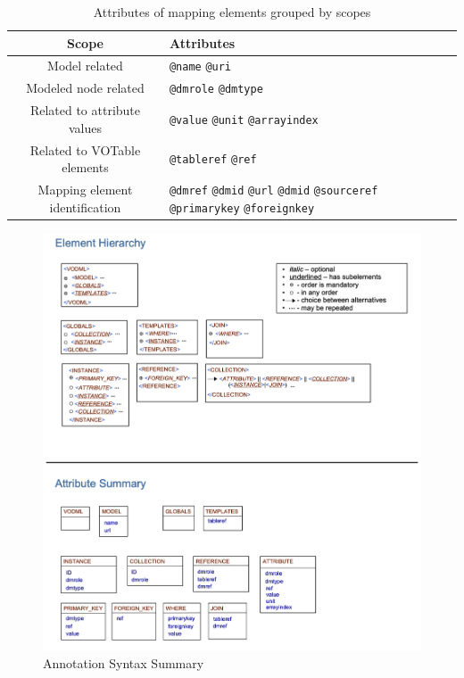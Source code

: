 \begin{table}[!htbp]
\small
\centering
\begin{tabulary}{\linewidth}{|c|J|}       
       \hline 
            \textbf{Scope} & 
            \textbf {Attributes}\\
       \hline         
       \hline  
             Model related & 
             \texttt{@name} \texttt{@uri} \\
       \hline  
             Modeled node related & 
             \texttt{@dmrole} \texttt{@dmtype} \\
       \hline  
             Related to attribute values & 
             \texttt{@value} \texttt{@unit} \texttt{@arrayindex} \\
       \hline  
             Related to VOTable elements & 
             \texttt{@tableref} \texttt{@ref} \\
       \hline  
             Mapping element identification& 
             \texttt{@dmref} \texttt{@dmid} \texttt{@url} \texttt{@dmid} \texttt{@sourceref} \texttt{@primarykey} \texttt{@foreignkey} \\
       \hline
     \end{tabulary}
     \caption{Attributes of mapping elements grouped by scopes} 
     \label{tbl:syntax-att}
 \end{table}
 
 


  \begin{figure}[h]
    \begin{center}
      \includegraphics[width=\textwidth]{mivot-summary.png}
      \caption{Annotation Syntax Summary}
      \label{fig:summary}
    \end{center}
  \end{figure}
